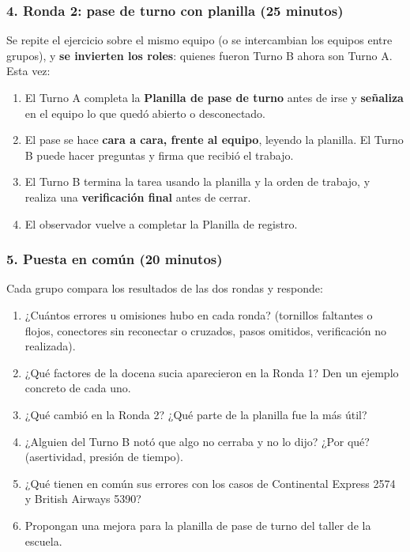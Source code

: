 \subsubsection*{4. Ronda 2: pase de turno con planilla (25 minutos)}
Se repite el ejercicio sobre el mismo equipo (o se intercambian los equipos entre grupos), y
\textbf{se invierten los roles}: quienes fueron Turno B ahora son Turno A. Esta vez:
\begin{enumerate}
  \item El Turno A completa la \textbf{Planilla de pase de turno} antes de irse y
        \textbf{señaliza} en el equipo lo que quedó abierto o desconectado.
  \item El pase se hace \textbf{cara a cara, frente al equipo}, leyendo la planilla. El Turno B
        puede hacer preguntas y firma que recibió el trabajo.
  \item El Turno B termina la tarea usando la planilla y la orden de trabajo, y realiza una
        \textbf{verificación final} antes de cerrar.
  \item El observador vuelve a completar la Planilla de registro.
\end{enumerate}

\subsubsection*{5. Puesta en común (20 minutos)}
Cada grupo compara los resultados de las dos rondas y responde:
\begin{enumerate}
  \item ¿Cuántos errores u omisiones hubo en cada ronda? (tornillos faltantes o flojos,
        conectores sin reconectar o cruzados, pasos omitidos, verificación no realizada).
  \item ¿Qué factores de la docena sucia aparecieron en la Ronda 1? Den un ejemplo concreto de
        cada uno.
  \item ¿Qué cambió en la Ronda 2? ¿Qué parte de la planilla fue la más útil?
  \item ¿Alguien del Turno B notó que algo no cerraba y no lo dijo? ¿Por qué? (asertividad,
        presión de tiempo).
  \item ¿Qué tienen en común sus errores con los casos de Continental Express 2574 y
        British Airways 5390?
  \item Propongan una mejora para la planilla de pase de turno del taller de la escuela.
\end{enumerate}

